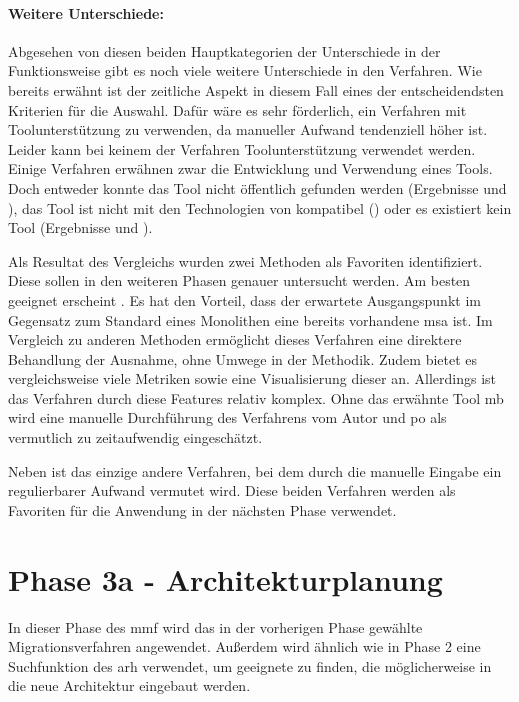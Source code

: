 \paragraph{Weitere Unterschiede:} Abgesehen von diesen beiden Hauptkategorien der Unterschiede in der Funktionsweise gibt es noch viele weitere Unterschiede in den Verfahren.
Wie bereits erwähnt ist der zeitliche Aspekt in diesem Fall eines der entscheidendsten Kriterien für die Auswahl.
Dafür wäre es sehr förderlich, ein Verfahren mit Toolunterstützung zu verwenden, da manueller Aufwand tendenziell höher ist.
Leider kann bei keinem der Verfahren Toolunterstützung verwendet werden.
Einige Verfahren erwähnen zwar die Entwicklung und Verwendung eines Tools.
Doch entweder konnte das Tool nicht öffentlich gefunden werden (Ergebnisse  und ), das Tool ist nicht mit den Technologien von \jf kompatibel () oder es existiert kein Tool (Ergebnisse  und ).

Als Resultat des Vergleichs wurden zwei Methoden als Favoriten identifiziert.
Diese sollen in den weiteren Phasen genauer untersucht werden.
Am besten geeignet erscheint .
Es hat den Vorteil, dass der erwartete Aus\-gangs\-punkt im Gegensatz zum Standard eines Monolithen eine bereits vorhandene \gls{msa} ist.
Im Vergleich zu anderen Methoden ermöglicht dieses Verfahren eine direktere Behandlung der Ausnahme, ohne Umwege in der Methodik.
Zudem bietet es vergleichsweise viele Metriken sowie eine Visualisierung dieser an.
Allerdings ist das Verfahren durch diese Features relativ komplex.
Ohne das erwähnte Tool \gls{mb} wird eine manuelle Durchführung des Verfahrens vom Autor und \gls{po} als vermutlich zu zeitaufwendig eingeschätzt.

Neben  ist  das einzige andere Verfahren, bei dem durch die manuelle Eingabe ein regulierbarer Aufwand vermutet wird.
Diese beiden Verfahren werden als Favoriten für die Anwendung in der nächsten Phase verwendet.

\section{Phase 3a - Architekturplanung}
\label{sec:durchführung-phase3}

In dieser Phase des \acrfull{mmf} wird das in der vorherigen Phase gewählte Migrationsverfahren angewendet.
Außerdem wird ähnlich wie in Phase 2 eine Suchfunktion des \gls{arh} verwendet, um geeignete \bpp zu finden, die möglicherweise in die neue Architektur eingebaut werden.

